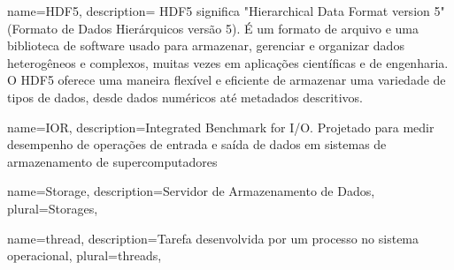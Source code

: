 {
    name={HDF5},
    description={ HDF5 significa "Hierarchical Data Format version 5" (Formato de Dados Hierárquicos versão 5). É um formato de arquivo e uma biblioteca de software usado para armazenar, gerenciar e organizar dados heterogêneos e complexos, muitas vezes em aplicações científicas e de engenharia. O HDF5 oferece uma maneira flexível e eficiente de armazenar uma variedade de tipos de dados, desde dados numéricos até metadados descritivos. }
}



{
    name={IOR},
    description={Integrated Benchmark for I/O. Projetado para medir desempenho de operações de entrada e saída de dados em sistemas de armazenamento de supercomputadores}
}

{
    name={Storage},
    description={Servidor de Armazenamento de Dados},
    plural={Storages},
}

{
    name={thread},
    description={Tarefa desenvolvida por um processo no sistema operacional},
    plural={threads},
}














\makeglossaries
